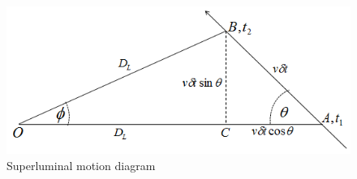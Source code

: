 \documentclass{article}
\begin{document}
\section{}

\begin{figure}
    \centering
    \includegraphics[width=
\textwidth]{Superluminal_motion_in_AGN_jets.png}
    \caption{Superluminal motion diagram}
    \label{fig:my_label}
\end{figure}
\end{document}
